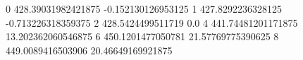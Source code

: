 0 428.39031982421875 -0.152130126953125
1 427.8292236328125 -0.713226318359375
2 428.5424499511719 0.0
4 441.74481201171875 13.202362060546875
6 450.1201477050781 21.57769775390625
8 449.0089416503906 20.46649169921875
